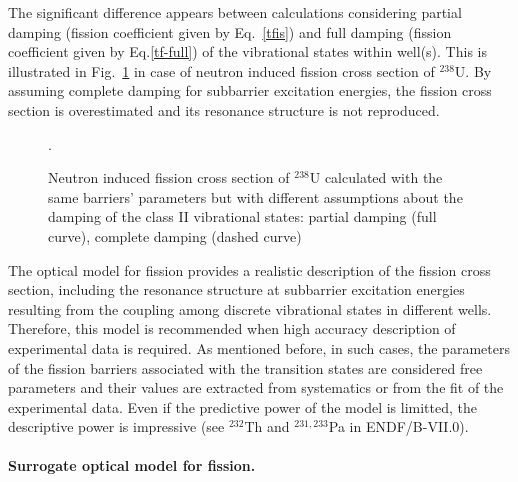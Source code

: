 The significant difference appears between calculations considering partial
damping (fission coefficient given by Eq.~\ref{tfis}) and full damping
(fission coefficient given by Eq.\ref{tf-full}) of the vibrational states
within well(s). This is illustrated in Fig.~\ref{fis-u38-fcom} in case of
neutron induced fission cross section of $^{238}$U. By assuming complete
damping for subbarrier excitation energies, the fission cross section is
overestimated and its resonance structure is not reproduced.
\begin{figure}[htbp]
 .
\caption{Neutron induced fission cross section of $^{238}$U calculated with
the same barriers' parameters but with different assumptions about the
damping of the class II vibrational states: partial damping (full curve),
complete damping (dashed curve)}
\label{fis-u38-fcom}
\end{figure}

The optical model for fission provides a realistic description of the
fission cross section, including the resonance structure at subbarrier
excitation energies resulting from the coupling among discrete vibrational states in
different wells. Therefore, this model is recommended when high
accuracy description of experimental data is required. As mentioned
before, in such cases, the parameters of the fission barriers associated with
the transition states are considered free parameters and their values are
extracted from systematics or from the fit of the experimental data. Even if
the predictive power of the model is limitted, the descriptive power is
impressive (see $^{232}$Th and $^{231,233}$Pa in ENDF/B-VII.0\cite{ENDF-VII}).

\medskip %

\paragraph*{Surrogate optical model for fission.}

